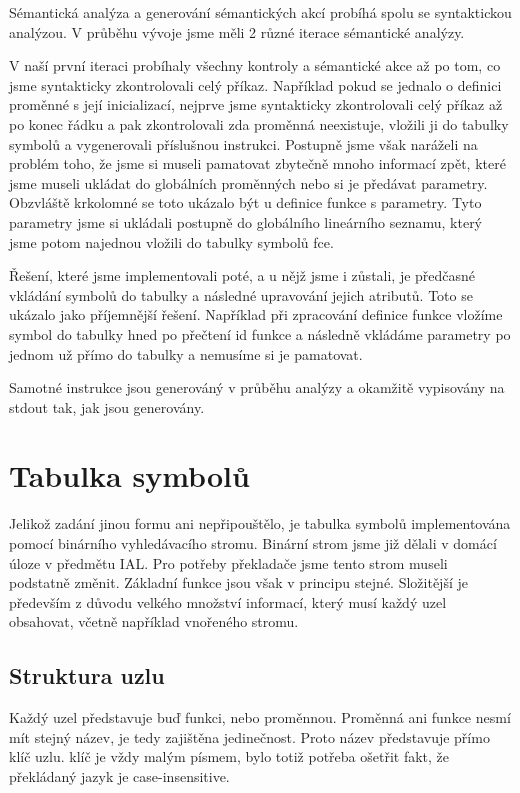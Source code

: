 \documentclass[11pt, a4paper]{article}
\begin{document}
Sémantická analýza a generování sémantických akcí probíhá spolu se syntaktickou analýzou. V průběhu vývoje jsme měli 2 různé iterace sémantické analýzy. 

V naší první iteraci probíhaly všechny kontroly a sémantické akce až po tom, co jsme syntakticky zkontrolovali celý příkaz. Například pokud se jednalo o definici proměnné s její inicializací, nejprve jsme syntakticky zkontrolovali celý příkaz až po konec řádku a pak zkontrolovali zda proměnná neexistuje, vložili ji do tabulky symbolů a vygenerovali příslušnou instrukci.
Postupně jsme však naráželi na problém toho, že jsme si museli pamatovat zbytečně mnoho informací zpět, které jsme museli ukládat do globálních proměnných nebo si je předávat parametry. Obzvláště krkolomné se toto ukázalo být u definice funkce s parametry. Tyto parametry jsme si ukládali postupně do globálního lineárního seznamu, který jsme potom najednou vložili do tabulky symbolů fce.

Řešení, které jsme implementovali poté, a u nějž jsme i zůstali, je předčasné vkládání symbolů do tabulky a následné upravování jejich atributů. Toto se ukázalo jako příjemnější řešení. Například při zpracování definice funkce vložíme symbol do tabulky hned po přečtení id funkce a následně vkládáme parametry po jednom už přímo do tabulky a nemusíme si je pamatovat. 

Samotné instrukce jsou generováný v průběhu analýzy a okamžitě vypisovány na stdout tak, jak jsou generovány.

\section{Tabulka symbolů}
Jelikož zadání jinou formu ani nepřipouštělo, je tabulka symbolů implementována pomocí binárního vyhledávacího stromu. Binární strom jsme již dělali v domácí úloze v předmětu IAL. Pro potřeby překladače jsme tento strom museli podstatně změnit. Základní funkce jsou však v principu stejné. Složitější je především z důvodu velkého množství informací, který musí každý uzel obsahovat, včetně například vnořeného stromu.

\subsection{Struktura uzlu}
Každý uzel představuje buď funkci, nebo proměnnou. Proměnná ani funkce nesmí mít stejný název, je tedy zajištěna jedinečnost. Proto název představuje přímo klíč uzlu. klíč je vždy malým písmem, bylo totiž potřeba ošetřit fakt, že překládaný jazyk je case-insensitive.
\end{document}

